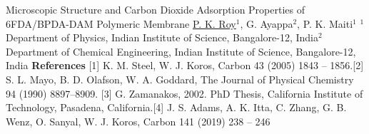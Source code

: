 \begin{abstract_online}{Microscopic Structure and Carbon Dioxide Adsorption Properties of 6FDA/BPDA-DAM Polymeric Membrane}{%
        \underline{P. K. Roy}$^{1}$, G. Ayappa$^{2}$, P. K. Maiti$^{1}$}{%
        }{%
        $^1$ Department of Physics, Indian Institute of Science, Bangalore-12, India\newline{}$^2$ Department of Chemical Engineering, Indian Institute of Science, Bangalore-12, India}
        \textbf{References} \newline{}[1]  K. M. Steel, W. J. Koros, Carbon 43 (2005) 1843 – 1856.\newline{}[2] S. L. Mayo, B. D. Olafson, W. A. Goddard, The Journal of Physical Chemistry 94 (1990) 8897–8909. \newline{}[3] G. Zamanakos, 2002. PhD Thesis, California Institute of Technology, Pasadena, California.\newline{}[4] J. S. Adams, A. K. Itta, C. Zhang, G. B. Wenz, O. Sanyal, W. J. Koros, Carbon 141 (2019) 238 – 246 
    \end{abstract_online}
    